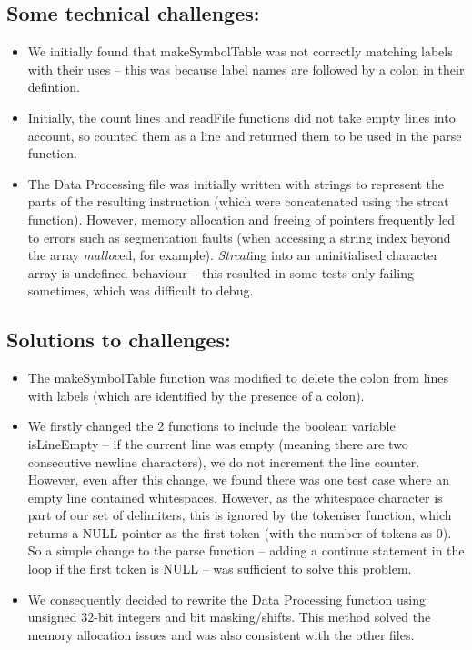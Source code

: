 \documentclass{article}
\begin{document}
\subsection{Some technical challenges: }

\begin{itemize}
    \item  We initially found that makeSymbolTable was not correctly matching labels with their uses – this was because label names are followed by a colon in their defintion. 

    \item Initially, the count lines and readFile functions did not take empty lines into account, so counted them as a line and returned them to be used in the parse function. 

    \item    The Data Processing file was initially written with strings to represent the parts of the resulting instruction (which were concatenated using the strcat function). However, memory allocation and freeing of pointers frequently led to errors such as segmentation faults (when accessing a string index beyond the array \emph{malloc}ed, for example). \emph{Strcat}ing into an uninitialised character array is undefined behaviour – this resulted in some tests only failing sometimes, which was difficult to debug. 

\end{itemize}

\subsection{Solutions to challenges: }

\begin{itemize}
    \item  The makeSymbolTable function was modified to delete the colon from lines with labels (which are identified by the presence of a colon).

    \item We firstly changed the 2 functions to include the boolean variable isLineEmpty – if the current line was empty (meaning there are two consecutive newline characters), we do not increment the line counter. However, even after this change, we found there was one test case where an empty line contained whitespaces. However, as the whitespace character is part of our set of delimiters, this is ignored by the tokeniser function, which returns a NULL pointer as the first token (with the number of tokens as 0). So a simple change to the parse function – adding a continue statement in the loop if the first token is NULL – was sufficient to solve this problem.

    \item We consequently decided to rewrite the Data Processing function using unsigned 32-bit integers and bit masking/shifts. This method solved the memory allocation issues and was also consistent with the other files. 

\end{itemize}
\end{document}
